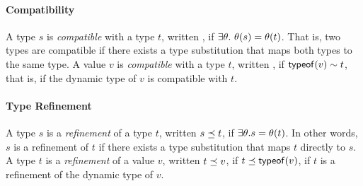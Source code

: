 \paragraph{Compatibility}
%
A type $s$ is \emph{compatible} with a type $t$, written ,
if $\exists \theta.\ \theta(s) = \theta(t)$.
%
That is, two types are compatible if there exists a type substitution
that maps both types to the same type.
%
A value $v$ is \emph{compatible} with a type $t$, written ,
if $\mathsf{typeof}(v) \sim t$, that is, if the dynamic type of $v$ is
compatible with $t$.


\paragraph{Type Refinement}
A type $s$ is a \emph{refinement} of a type $t$, written ${s} \preceq {t}$,
if $\exists \theta. s = \theta(t)$.
%
In other words, $s$ is a refinement of $t$ if there exists a type
substitution that maps $t$ directly to $s$.
%
A type $t$ is a \emph{refinement} of a value $v$, written ${t} \preceq {v}$,
if ${t} \preceq {\ensuremath{\mathsf{typeof}(v)}}$, \ie if $t$ is a refinement of the
dynamic type of $v$.
%

